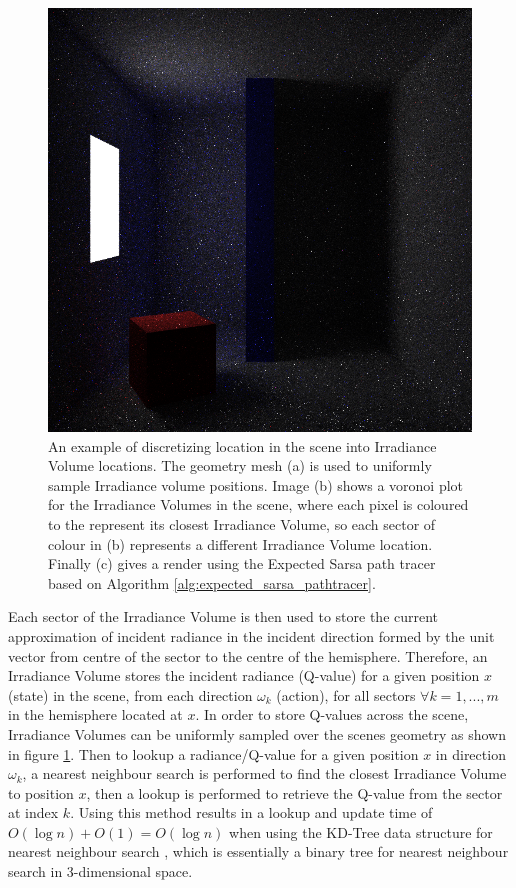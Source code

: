 \documentclass[../dissertation.tex]{subfiles}
\begin{document}
\begin{figure}[!htb]
\endminipage\hfill
{}
\includegraphics[width=1\textwidth]{images/renders/simple_room/reinforcement_16.png}
\endminipage
\caption{An example of discretizing location in the scene into Irradiance Volume locations. The geometry mesh (a) is used to uniformly sample Irradiance volume positions. Image (b) shows a voronoi plot for the Irradiance Volumes in the scene, where each pixel is coloured to the represent its closest Irradiance Volume, so each sector of colour in (b) represents a different Irradiance Volume location. Finally (c) gives a render using the Expected Sarsa path tracer based on Algorithm \ref{alg:expected_sarsa_pathtracer}.}
\label{fig:scene_discretization_example}
\end{figure}

Each sector of the Irradiance Volume is then used to store the current approximation of incident radiance in the incident direction formed by the unit vector from centre of the sector to the centre of the hemisphere. Therefore, an Irradiance Volume stores the incident radiance (Q-value) for a given position $x$ (state) in the scene, from each direction $\omega_k$ (action), for all sectors $\forall k = 1,...,m$ in the hemisphere located at $x$. In order to store Q-values across the scene, Irradiance Volumes can be uniformly sampled over the scenes geometry as shown in figure \ref{fig:scene_discretization_example}. Then to lookup a radiance/Q-value for a given position $x$ in direction $\omega_k$, a nearest neighbour search is performed to find the closest Irradiance Volume to position $x$, then a lookup is performed to retrieve the Q-value from the sector at index $k$. Using this method results in a lookup and update time of $O(\log n) + O(1) = O(\log n)$ when using the KD-Tree data structure for nearest neighbour search \cite{bentley1975multidimensional}, which is essentially a binary tree for nearest neighbour search in 3-dimensional space. 
\end{document}
